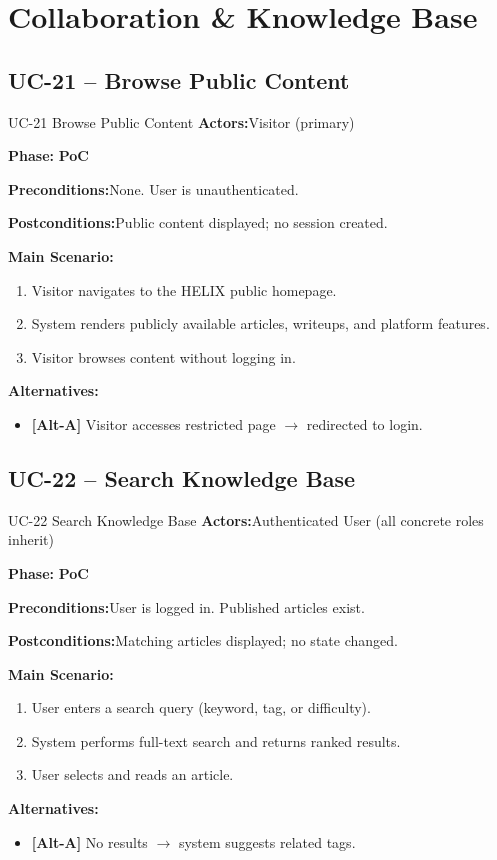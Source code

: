 \documentclass[12pt,a4paper]{report}
\newcommand{\ucfield}[2]{%
    \noindent\textbf{\color{helixpurplemid}#1:}\quad #2\par\medskip
}
\newcommand{\ucphase}[1]{%
    \noindent\textbf{\color{helixpurplemid}Phase:}\quad%
    \ifstrequal{#1}{PoC}{\textcolor{helixteal}{\textbf{PoC}}}{\textcolor{helixamber}{\textbf{Future MVP}}}%
    \par\medskip
}
\begin{document}
\chapter{Collaboration \& Knowledge Base}

\section{UC-21 -- Browse Public Content}
\begin{ucbox}{UC-21 \quad Browse Public Content}
    \ucfield{Actors}{Visitor (primary)}
    \ucphase{PoC}
    \ucfield{Preconditions}{None. User is unauthenticated.}
    \ucfield{Postconditions}{Public content displayed; no session created.}
    \textbf{\color{helixpurplemid}Main Scenario:}
    \begin{enumerate}
        \item Visitor navigates to the HELIX public homepage.
        \item System renders publicly available articles, writeups, and platform features.
        \item Visitor browses content without logging in.
    \end{enumerate}
    \textbf{\color{helixpurplemid}Alternatives:}
    \begin{itemize}
        \item \textbf{[Alt-A]} Visitor accesses restricted page $\rightarrow$ redirected to login.
    \end{itemize}
\end{ucbox}

\section{UC-22 -- Search Knowledge Base}
\begin{ucbox}{UC-22 \quad Search Knowledge Base}
    \ucfield{Actors}{Authenticated User (all concrete roles inherit)}
    \ucphase{PoC}
    \ucfield{Preconditions}{User is logged in. Published articles exist.}
    \ucfield{Postconditions}{Matching articles displayed; no state changed.}
    \textbf{\color{helixpurplemid}Main Scenario:}
    \begin{enumerate}
        \item User enters a search query (keyword, tag, or difficulty).
        \item System performs full-text search and returns ranked results.
        \item User selects and reads an article.
    \end{enumerate}
    \textbf{\color{helixpurplemid}Alternatives:}
    \begin{itemize}
        \item \textbf{[Alt-A]} No results $\rightarrow$ system suggests related tags.
    \end{itemize}
\end{ucbox}
\end{document}
